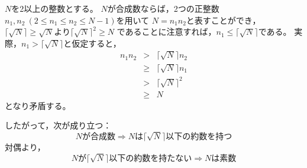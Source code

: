 \documentclass{article}
\begin{document}
$N$を2以上の整数とする。
$N$が合成数ならば，2つの正整数$n_1, n_2\ (2 \leq n_1 \leq n_2 \leq N - 1)$を用いて
$N = n_1 n_2$と表すことができ，
$\lceil \sqrt{N} \rceil \geq \sqrt{N}$より$\lceil \sqrt{N} \rceil^2 \geq N$
であることに注意すれば，$n_1 \leq \lceil \sqrt{N} \rceil$である。
実際，$n_1 > \lceil \sqrt{N} \rceil$と仮定すると，
\begin{eqnarray*}
    n_1 n_2 &>&    \lceil \sqrt{N} \rceil n_2 \\
            &\geq& \lceil \sqrt{N} \rceil n_1 \\
            &>&    \lceil \sqrt{N} \rceil^2 \\
            &\geq& N
\end{eqnarray*}
となり矛盾する。

したがって，次が成り立つ：
\[
    \mbox{$N$が合成数} \Longrightarrow \mbox{$N$は$\lceil \sqrt{N} \rceil$以下の約数を持つ}
\]
対偶より，
\[
    \mbox{$N$が$\lceil \sqrt{N} \rceil$以下の約数を持たない} \Longrightarrow \mbox{$N$は素数} 
\]
\end{document}
